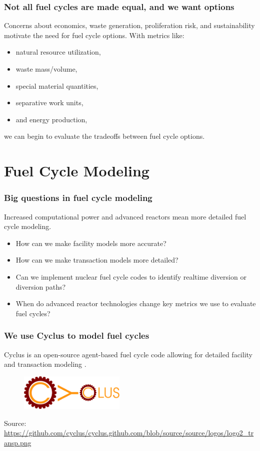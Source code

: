 \documentclass[9pt]{beamer}
\begin{document}
  \begin{frame}
      \frametitle{Not all fuel cycles are made equal, and we want options}
      Concerns about economics, waste generation, proliferation risk, and sustainability motivate the need for fuel cycle options. With metrics like:
        \begin{itemize}%
            \item natural resource utilization,
            \item waste mass/volume,
            \item special material quantities,
            \item separative work units,
            \item and energy production,
        \end{itemize}
        we can begin to evaluate the tradeoffs between fuel cycle options.
  \end{frame}

\section{Fuel Cycle Modeling}
  \begin{frame}
    \frametitle{Big questions in fuel cycle modeling}
    Increased computational power and advanced reactors mean more detailed fuel cycle modeling.
    \begin{itemize}
        \item How can we make facility models more accurate?
        \item How can we make transaction models more detailed?
        \item Can we implement nuclear fuel cycle codes to identify realtime diversion or diversion paths?
        \item When do advanced reactor technologies change key metrics we use to evaluate fuel cycles?
    \end{itemize}
  \end{frame}

  \begin{frame}
    \frametitle{We use Cyclus to model fuel cycles}
    \vspace{20pt}
    Cyclus is an open-source agent-based fuel cycle code allowing for detailed facility and transaction modeling \cite{huff_fundamental_2016}.
    \vspace{20pt}
    \begin{figure}
        \centering
        \includegraphics[width=0.45\textwidth]{./images/cyclus_logo.png}
    \end{figure}

    \vspace{37pt}
    Source: \url{https://github.com/cyclus/cyclus.github.com/blob/source/source/logos/logo2_transp.png}
  \end{frame}
\end{document}
